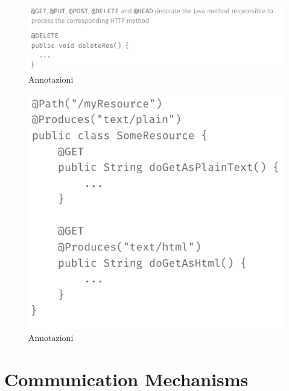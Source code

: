 \documentclass[12pt]{article}
\begin{document}
	\begin{figure}[h!]
		\centering
		\includegraphics[scale=0.40]{img/annotation.png}
		\caption{Annotazioni}
	\end{figure} 
	\begin{figure}[h!]
		\centering
		\includegraphics[scale=0.40]{img/annotation1.png}
		\caption{Annotazioni}
	\end{figure} 

	   
 	
 		
 		
 		
 		
 		
 		
		
		
		
		
		
		
	
\section{Communication Mechanisms}
\end{document}

